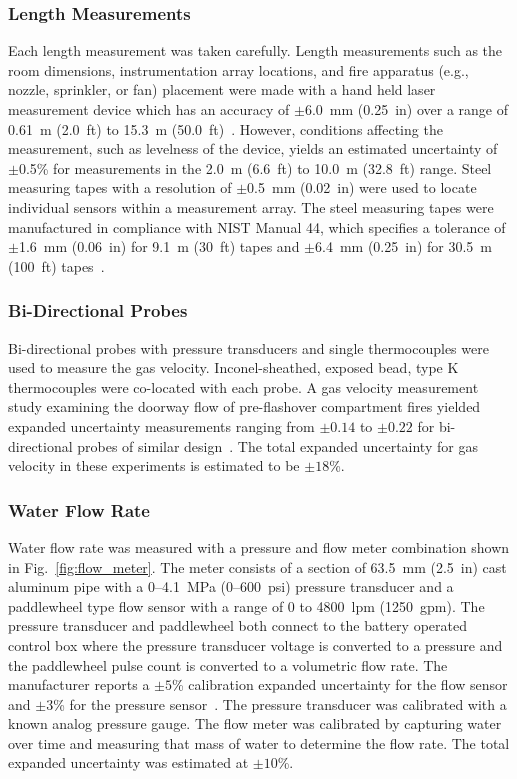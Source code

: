 \documentclass[12pt,oneside]{book}
\begin{document}
\subsubsection{Length Measurements}
Each length measurement was taken carefully. Length measurements such as the room dimensions, instrumentation array locations, and fire apparatus (e.g., nozzle, sprinkler, or fan) placement were made with a hand held laser measurement device which has an accuracy of $\pm$6.0~mm (0.25~in) over a range of 0.61~m (2.0~ft) to 15.3~m (50.0~ft)~\cite{StanleyTools}.  However, conditions affecting the measurement, such as levelness of the device, yields an estimated uncertainty of $\pm$0.5\% for measurements in the 2.0~m (6.6~ft) to 10.0~m (32.8~ft) range. Steel measuring tapes with a resolution of $\pm$0.5~mm (0.02~in) were used to locate individual sensors within a measurement array. The steel measuring tapes were manufactured in compliance with NIST Manual 44, which specifies a tolerance of $\pm$1.6~mm (0.06~in) for 9.1~m (30~ft) tapes and $\pm$6.4~mm (0.25~in) for 30.5~m (100~ft) tapes~\cite{Butcher:2012}.

\subsubsection{Bi-Directional Probes}
Bi-directional probes with pressure transducers and single thermocouples were used to measure the gas velocity. Inconel-sheathed, exposed bead, type K thermocouples were co-located with each probe. A gas velocity measurement study examining the doorway flow of pre-flashover compartment fires yielded expanded uncertainty measurements ranging from $\pm0.14$ to $\pm0.22$ for bi-directional probes of similar design~\cite{Bryant:FSJ2009}. The total expanded uncertainty for gas velocity in these experiments is estimated to be $\pm18$\%.   

\subsubsection{Water Flow Rate}
Water flow rate was measured with a pressure and flow meter combination shown in Fig.~\ref{fig:flow_meter}. The meter consists of a section of 63.5~mm (2.5~in) cast aluminum pipe with a 0--4.1~MPa (0--600~psi) pressure transducer and a paddlewheel type flow sensor with a range of 0 to 4800~lpm (1250~gpm). The pressure transducer and paddlewheel both connect to the battery operated control box where the pressure transducer voltage is converted to a pressure and the paddlewheel pulse count is converted to a volumetric flow rate. The manufacturer reports a $\pm5$\% calibration expanded uncertainty for the flow sensor and $\pm3$\% for the pressure sensor~\cite{Akron:2009}. The pressure transducer was calibrated with a known analog pressure gauge. The flow meter was calibrated by capturing water over time and measuring that mass of water to determine the flow rate. The total expanded uncertainty was estimated at $\pm10$\%. 
\end{document}
